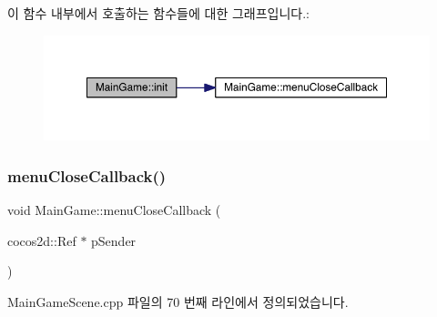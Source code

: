 이 함수 내부에서 호출하는 함수들에 대한 그래프입니다.\+:
\nopagebreak
\begin{figure}[H]
\begin{center}
\leavevmode
\includegraphics[width=350pt]{df/d8a/class_main_game_ab518edeb854c0447539b829790397dc6_cgraph}
\end{center}
\end{figure}
\mbox{\label{class_main_game_a824206defd2b5af2359c3699aa55e289}} 
\subsubsection{\texorpdfstring{menu\+Close\+Callback()}{menuCloseCallback()}}
{\footnotesize\ttfamily void Main\+Game\+::menu\+Close\+Callback (\begin{DoxyParamCaption}\item[{cocos2d\+::\+Ref $\ast$}]{p\+Sender }\end{DoxyParamCaption})}



Main\+Game\+Scene.\+cpp 파일의 70 번째 라인에서 정의되었습니다.


